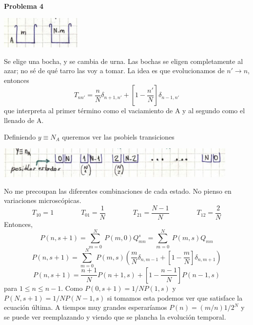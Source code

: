 \documentclass[10pt,oneside]{CBFT_book}
\begin{document}
\begin{ejemplo}{\bf Problema 4}
 
\includegraphics[width=0.30\textwidth]{images/1606329215.jpg}

Se elige una bocha, y se cambia de urna. Las bochas se eligen completamente al azar; no sé de qué 
tarro las voy a tomar.
La idea es que evolucionamos de $n' \to n$, entonces
\[
	T_{nn' } = \frac{n}{N} \delta_{n+1,n'} + \left[ 1 - \frac{n'}{N} \right] \delta_{n-1,n'}
\]
que interpreta al primer término como el vaciamiento de A y al segundo como el llenado de A.

Definiendo $y \equiv N_A$ queremos ver las psobiels transiciones

\includegraphics[width=0.90\textwidth]{images/1610808616.jpg}

No me precoupan las diferentes combinaciones de cada estado. No pienso en variaciones microscópicas.
\[
	T_{10} = 1 \qquad \qquad T_{01} = \frac 1 N \qquad \qquad 
	T_{21} = \frac {N-1} N \qquad \qquad T_{12} = \frac 2 N
\]
Entonces,
\[
	P(n,s+1) = \sum_{m=0}^N \: P(m,0) Q_{mn}^s = \sum_{m=0}^N \: P(m,s) Q_{mn}
\]
\[
	P(n,s+1) = \sum_{m=0}^N \: P(m,s) 
	\left( \frac{m}{N} \delta_{n,m-1} + \left[ 1 - \frac{m}{N} \right] \delta_{n,m+1} \right)
\]
\[
	P(n,s+1) = \frac{n+1}{N} P(n+1,s) + \left[ 1 - \frac{n-1}{N} \right] P(n-1,s)
\]
para $1 \leq n \leq n-1$. Como $P(0,s+1) = 1/N P(1,s)$ y $P(N,s+1)=1/N P(N-1,s)$ si tomamos esta
podemos ver que satisface la ecuación última.
A tiempos muy grandes esperaríamos $P(n)=(m/n) 1/2^N$ y se puede ver reemplazando y viendo que se
plancha la evolución temporal.
 
\end{ejemplo}
\end{document}
